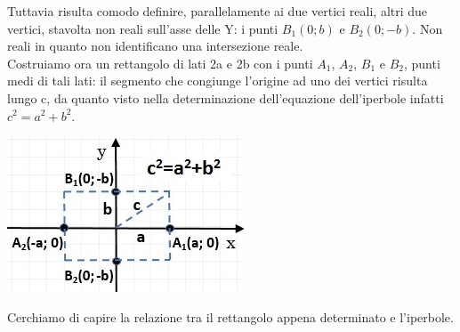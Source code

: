 \begin{description}
  \begin{minipage}[c]{.65\textwidth}
  Tuttavia risulta comodo definire, parallelamente ai due vertici 
reali, altri due vertici, stavolta non reali sull'asse delle Y: i punti $ 
B_{1} (0; b)$ e $ B_{2} (0; -b)$. Non reali in quanto non identificano una 
intersezione reale.\\ Costruiamo ora un rettangolo di lati 2a e 2b con i 
punti $ A_{1} $, $ A_{2} $, $ B_{1} $ e $ B_{2} $, punti medi di tali lati: 
il segmento che congiunge l'origine ad uno dei vertici risulta lungo c, da 
quanto visto nella determinazione dell'equazione dell'iperbole infatti $ 
c^{2} = a^{2} + b^{2} $.
  \end{minipage}
  \hspace{.5cm}
  \begin{minipage}[c]{.3\textwidth}
    \includegraphics[width=\textwidth]{img/rettangolo.jpg}
  \end{minipage}

Cerchiamo di capire la relazione tra il rettangolo appena determinato e 
l'iperbole.


\end{description}
